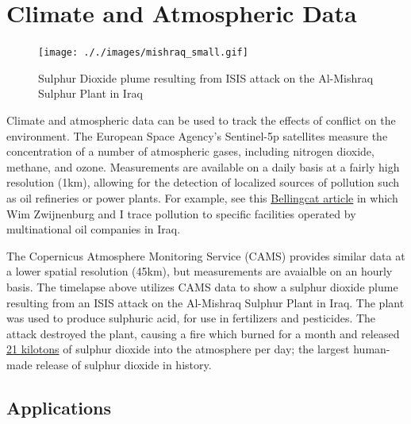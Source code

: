 \documentclass[
  letterpaper,
  DIV=11,
  numbers=noendperiod]{scrreprt}
\begin{document}
\hypertarget{climate-and-atmospheric-data}{%
\section{Climate and Atmospheric
Data}\label{climate-and-atmospheric-data}}

\begin{figure}

{\centering \texttt{[image: ././images/mishraq\_small.gif]}

}

\caption{Sulphur Dioxide plume resulting from ISIS attack on the
Al-Mishraq Sulphur Plant in Iraq}

\end{figure}

Climate and atmospheric data can be used to track the effects of
conflict on the environment. The European Space Agency's Sentinel-5p
satellites measure the concentration of a number of atmospheric gases,
including nitrogen dioxide, methane, and ozone. Measurements are
available on a daily basis at a fairly high resolution (1km), allowing
for the detection of localized sources of pollution such as oil
refineries or power plants. For example, see this
\href{https://www.bellingcat.com/resources/2021/04/15/what-oil-satellite-technology-and-iraq-can-tell-us-about-pollution/}{Bellingcat
article} in which Wim Zwijnenburg and I trace pollution to specific
facilities operated by multinational oil companies in Iraq.

The Copernicus Atmosphere Monitoring Service (CAMS) provides similar
data at a lower spatial resolution (45km), but measurements are
avaialble on an hourly basis. The timelapse above utilizes CAMS data to
show a sulphur dioxide plume resulting from an ISIS attack on the
Al-Mishraq Sulphur Plant in Iraq. The plant was used to produce
sulphuric acid, for use in fertilizers and pesticides. The attack
destroyed the plant, causing a fire which burned for a month and
released
\href{https://earthobservatory.nasa.gov/images/88994/sulfur-dioxide-spreads-over-iraq}{21
kilotons} of sulphur dioxide into the atmosphere per day; the largest
human-made release of sulphur dioxide in history.

\hypertarget{applications-3}{%
\subsection*{Applications}\label{applications-3}}
\end{document}
